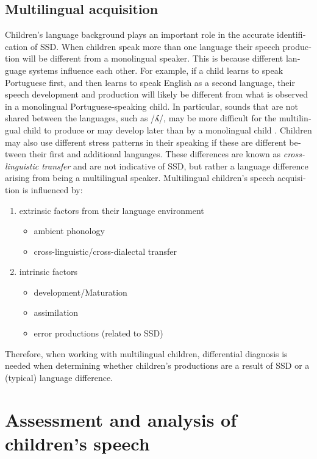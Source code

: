 \documentclass[output=paper,colorlinks,citecolor=brown]{langscibook}
\begin{document}
\begin{otherlanguage}{english}
\subsection*{Multilingual acquisition}
Children’s language background plays an important role in the accurate identification of SSD. When children speak more than one language their speech production will be different from a monolingual speaker. This is because different language systems influence each other. For example, if a child learns to speak Portuguese first, and then learns to speak English as a second language, their speech development and production will likely be different from what is observed in a monolingual Portuguese-speaking child. In particular, sounds that are not shared between the languages, such as /ʎ/, may be more difficult for the multilingual child to produce or may develop later than by a monolingual child \citep{McLeod2018a}. Children may also use different stress patterns in their speaking if these are different between their first and additional languages. These differences are known as \emph{cross-linguistic transfer} and are not indicative of SSD, but rather a language difference arising from being a multilingual speaker. Multilingual children’s speech acquisition is influenced by:


\begin{enumerate} [align=left]
\item [] extrinsic factors from their language environment
\begin{itemize}
    \item ambient phonology
\item	cross-linguistic/cross-dialectal transfer
\end{itemize}
\item [] intrinsic factors
\begin{itemize}
    \item development/Maturation
\item	assimilation
\item	error productions (related to SSD) \citep{McLeod2021}
\end{itemize}
\end{enumerate}


Therefore, when working with multilingual children, differential diagnosis is needed when determining whether children’s productions are a result of SSD or a (typical) language difference. 


\section{Assessment and analysis of children’s speech}


\end{otherlanguage}
\end{document}

